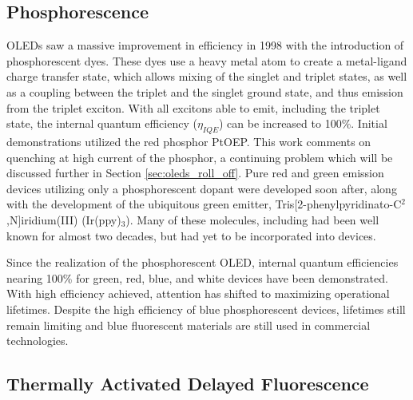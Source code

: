 \documentclass[../thesis.tex]{subfiles}
\begin{document}
\subsection{Phosphorescence}
OLEDs saw a massive improvement in efficiency in 1998 with the introduction of phosphorescent dyes.\supercite{Baldo1998a}
These dyes use a heavy metal atom to create a metal-ligand charge transfer state, which allows mixing of the singlet and triplet states, as well as a coupling between the triplet and the singlet ground state, and thus emission from the triplet exciton.
With all excitons able to emit, including the triplet state, the internal quantum efficiency ($\eta_{IQE}$) can be increased to 100\%.
Initial demonstrations utilized the red phosphor PtOEP.
This work comments on quenching at high current of the phosphor, a continuing problem which will be discussed further in Section \ref{sec:oleds_roll_off}.\supercite{Reineke2007,Hershey2016}
Pure red and green emission devices utilizing only a phosphorescent dopant were developed soon after, along with the development of the ubiquitous green emitter, Tris[2-phenylpyridinato-C$^2$,N]iridium(III) (Ir(ppy)$_3$).%
Many of these molecules, including \irppy had been well known for almost two decades,\supercite{King1985,Sprouse1984} but had yet to be incorporated into devices.


Since the realization of the phosphorescent OLED, internal quantum efficiencies nearing 100\% for green, red, blue, and white devices have been demonstrated.\supercite{Su2008a,Erickson2010}
With high efficiency achieved, attention has shifted to maximizing operational lifetimes.\supercite{Scholz2008}
Despite the high efficiency of blue phosphorescent devices, lifetimes still remain limiting and blue fluorescent materials are still used in commercial technologies.


\subsection{Thermally Activated Delayed Fluorescence}
\end{document}
